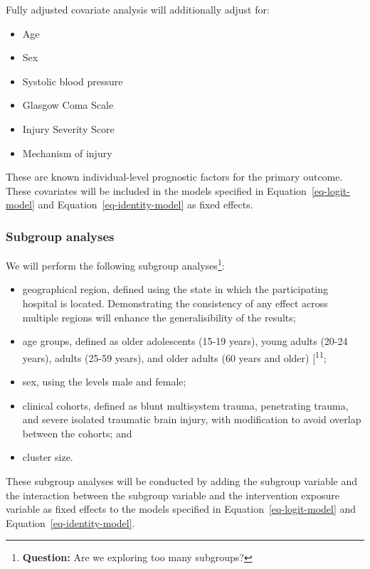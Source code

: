 \documentclass[
]{scrartcl}
\providecommand{\tightlist}{%
  \setlength{\itemsep}{0pt}\setlength{\parskip}{0pt}}\usepackage{longtable,booktabs,array}
\begin{document}
Fully adjusted covariate analysis will additionally adjust for:

\begin{itemize}
\tightlist
\item
  Age
\item
  Sex
\item
  Systolic blood pressure
\item
  Glasgow Coma Scale
\item
  Injury Severity Score
\item
  Mechanism of injury
\end{itemize}

These are known individual-level prognostic factors for the primary
outcome. These covariates will be included in the models specified in
Equation~\ref{eq-logit-model} and Equation~\ref{eq-identity-model} as
fixed effects.

\hypertarget{subgroup-analyses}{%
\subsubsection{Subgroup analyses}\label{subgroup-analyses}}

We will perform the following subgroup analyses\footnote{\textbf{Question:}
  Are we exploring too many subgroups?}:

\begin{itemize}
\tightlist
\item
  geographical region, defined using the state in which the
  participating hospital is located. Demonstrating the consistency of
  any effect across multiple regions will enhance the generalisibility
  of the results;
\item
  age groups, defined as older adolescents (15-19 years), young adults
  (20-24 years), adults (25-59 years), and older adults (60 years and
  older) {[}\textsuperscript{11};
\item
  sex, using the levels male and female;
\item
  clinical cohorts, defined as blunt multisystem trauma, penetrating
  trauma, and severe isolated traumatic brain injury, with modification
  to avoid overlap between the cohorts; and
\item
  cluster size.
\end{itemize}

These subgroup analyses will be conducted by adding the subgroup
variable and the interaction between the subgroup variable and the
intervention exposure variable as fixed effects to the models specified
in Equation~\ref{eq-logit-model} and Equation~\ref{eq-identity-model}.
\end{document}

